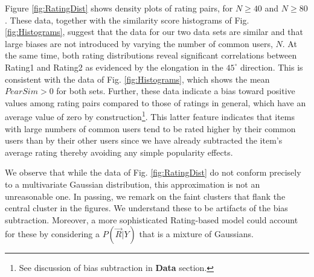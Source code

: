 \documentclass[11pt]{article}
\begin{document}
Figure \ref{fig:RatingDist} shows density plots of rating pairs, for $N \geq 40$
and $N \geq 80$. These data, together with the similarity score histograms of Fig.
\ref{fig:Histograms}, suggest that the data for our two data sets are similar
and that large biases are not introduced by varying the number of common users,
$N$. At the same time, both rating distributions reveal significant correlations
between Rating1 and Rating2 as evidenced by the elongation in the $45^\circ$
direction. This is consistent with the data of Fig. \ref{fig:Histograms}, which
shows the mean $PearSim > 0$ for both sets. Further, these data indicate a
bias toward positive values among rating pairs compared to those of ratings in
general, which have an average value of zero by construction\footnote{See
discussion of bias subtraction in {\bf Data} section.}. This latter feature
indicates that items with large numbers of common users tend to be rated higher
by their common users than by their other users since we have already subtracted
the item's average rating thereby avoiding any simple popularity effects.

We observe that while the data of Fig. \ref{fig:RatingDist} do not
conform precisely to a multivariate Gaussian distribution, this approximation is
not an unreasonable one. In passing, we remark on the faint clusters that flank
the central cluster in the figures. We understand these to be artifacts of the
bias subtraction. Moreover, a more sophisticated Rating-based model could
account for these by considering a $P(\vec{R} | Y)$ that is a mixture of
Gaussians. 
\end{document}
